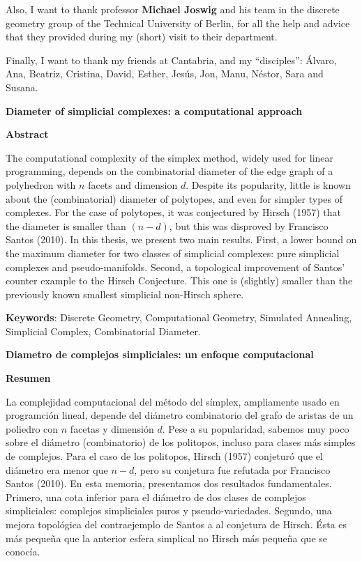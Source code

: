 \documentclass[12pt,a4paper]{article}
\theoremstyle{plain}
\theoremstyle{definition}
\begin{document}
Also, I want to thank professor \textbf{Michael Joswig} and his team in the discrete geometry group of the Technical University of Berlin, for all the help and advice that they provided during my (short) visit to their department.

Finally, I want to thank my friends at Cantabria, and my ``disciples'': Álvaro, Ana, Beatriz, Cristina, David, Esther, Jesús, Jon, Manu, Néstor, Sara and Susana.

\newpage

\begin{center}
    \textbf{Diameter of simplicial complexes: a computational approach}
   
    \vspace{0.5cm}
    \textbf{Abstract}
\end{center}
The computational complexity of the simplex method, widely used for linear programming, depends on the combinatorial diameter of the edge graph of a polyhedron with $n$ facets and dimension $d$. Despite its popularity, little is known about the (combinatorial) diameter of polytopes, and even for simpler types of complexes. For the case of polytopes, it was conjectured by Hirsch (1957) that the diameter is smaller than $(n-d)$, but this was disproved by Francisco Santos (2010). In this thesis, we present two main results. First, a lower bound on the maximum diameter for two classes of simplicial complexes: pure simplicial complexes and pseudo-manifolds. Second, a topological improvement of Santos' counter example to the Hirsch Conjecture. This one is (slightly) smaller than the previously known smallest simplicial non-Hirsch sphere.
\vspace{1cm}

\textbf{Keywords}: Discrete Geometry, Computational Geometry, Simulated Annealing, Simplicial Complex, Combinatorial Diameter.

\vspace{2cm}

\begin{center}
    \textbf{Diametro de complejos simpliciales: un enfoque computacional}
   
    \vspace{0.5cm}
    \textbf{Resumen}
\end{center} 
La complejidad computacional del método del símplex, ampliamente usado en programción lineal, depende del diámetro combinatorio del grafo de aristas de un poliedro con $n$ facetas y dimensión $d$. Pese a su popularidad, sabemos muy poco sobre el diámetro (combinatorio) de los politopos, incluso para clases más simples de complejos. Para el caso de los politopos, Hirsch (1957) conjeturó que el diámetro era menor que $n-d$, pero su conjetura fue refutada por Francisco Santos (2010). En esta memoria, presentamos dos resultados fundamentales. Primero, una cota inferior para el diámetro de dos clases de complejos simpliciales: complejos simpliciales puros y pseudo-variedades. Segundo, una mejora topológica del contraejemplo de Santos a al conjetura de Hirsch. Ésta es más pequeña que la anterior esfera simplical no Hirsch más pequeña que se conocía.
\vspace{1cm}
\end{document}
